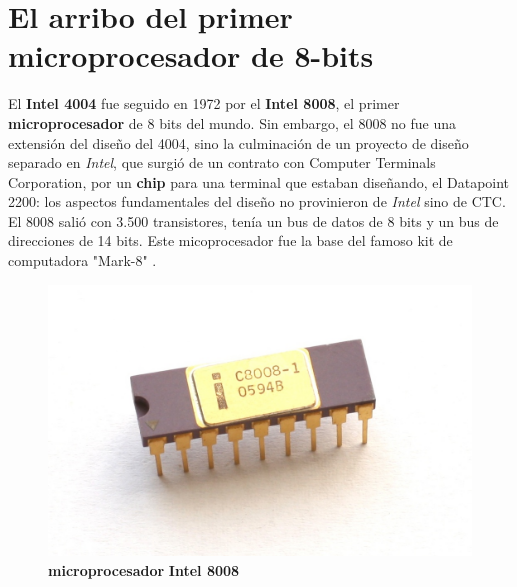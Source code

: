 \section{El arribo del primer microprocesador de 8-bits}
El \textbf{Intel 4004} fue seguido en 1972 por el \textbf{Intel 8008}, el primer \textbf{microprocesador} de 8 bits del mundo.
Sin embargo, el 8008 no fue una extensión del diseño del 4004, sino la culminación de un proyecto de diseño separado
en \emph{Intel}, que surgió de un contrato con Computer Terminals Corporation, por un \textbf{chip} para una terminal que
estaban diseñando, el Datapoint 2200: los aspectos fundamentales del diseño no provinieron de \emph{Intel} sino de CTC. 
El 8008 salió con 3.500 transistores, tenía un bus de datos de 8 bits y un bus de direcciones de 14 bits. Este micoprocesador
fue la base del famoso kit de computadora "Mark-8" .

\begin{figure}[htb]
	\centering
	\includegraphics[scale = 0.15]{Graphics/Intel_C8008-1.jpg}
	\caption{\textbf{microprocesador}  \textbf{Intel 8008}}
	\label{fig:13}
\end{figure}


